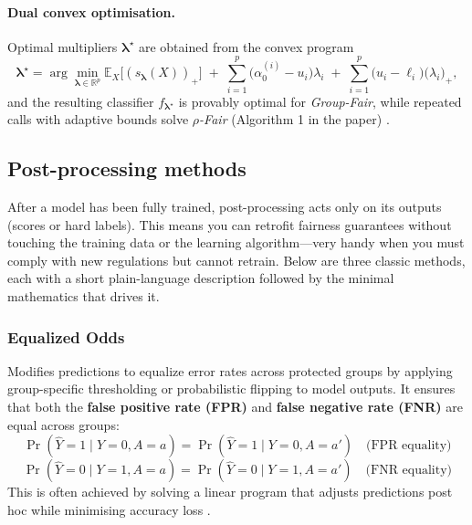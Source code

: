 \documentclass[12pt,a4paper,openright,twoside]{book}
\begin{document}
\paragraph{Dual convex optimisation.}
Optimal multipliers $\boldsymbol\lambda^\star$ are obtained from the convex program \cite{celis2020classificationfairnessconstraintsmetaalgorithm}
\[
\boldsymbol\lambda^\star=\arg\min_{\boldsymbol\lambda\in\mathbb{R}^p}
    \mathbb{E}_X\!\bigl[(s_{\boldsymbol\lambda}(X))_+\bigr]
    \;+\;
    \sum_{i=1}^{p}\bigl(\alpha^{(i)}_0-u_i\bigr)\lambda_i
    \;+\;
    \sum_{i=1}^{p}\bigl(u_i-\ell_i\bigr)\bigl(\lambda_i\bigr)_+,
\]
and the resulting classifier $f_{\boldsymbol\lambda^\star}$ is provably optimal for \emph{Group-Fair}, while repeated calls with adaptive bounds solve \emph{$\rho$-Fair} (Algorithm 1 in the paper) \cite{celis2020classificationfairnessconstraintsmetaalgorithm}.


\subsection{Post-processing methods} 
After a model has been fully trained, post-processing acts only on its outputs (scores or hard labels).
This means you can retrofit fairness guarantees without touching the training data or the learning algorithm—very handy when you must comply with new regulations but cannot retrain.
Below are three classic methods, each with a short plain-language description followed by the minimal mathematics that drives it.

\subsubsection{Equalized Odds} Modifies predictions to equalize error rates across protected groups by applying group-specific thresholding or probabilistic flipping to model outputs. It ensures that both the \textbf{false positive rate (FPR)} and \textbf{false negative rate (FNR)} are equal across groups:
\begin{equation}
    \Pr(\hat{Y} = 1 \mid Y = 0, A = a) = \Pr(\hat{Y} = 1 \mid Y = 0, A = a') \quad\text{(FPR equality)}
\end{equation}
\begin{equation}
    \Pr(\hat{Y} = 0 \mid Y = 1, A = a) = \Pr(\hat{Y} = 0 \mid Y = 1, A = a') \quad\text{(FNR equality)}
\end{equation}
This is often achieved by solving a linear program that adjusts predictions post hoc while minimising accuracy loss \cite{hardt2016equalityopportunitysupervisedlearning}.
\end{document}
